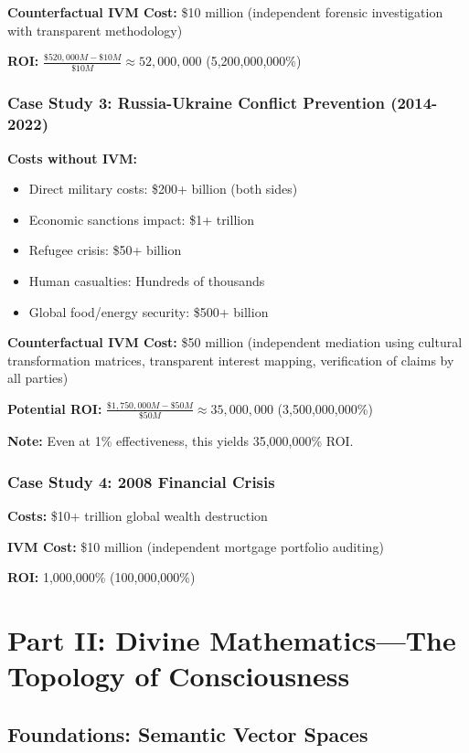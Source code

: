 \documentclass[11pt,a4paper]{article}
\theoremstyle{definition}
\theoremstyle{remark}
\begin{document}
\begin{small}
\textbf{Counterfactual IVM Cost:} \$10 million (independent forensic investigation with transparent methodology)

\textbf{ROI:} $\frac{\$520,000M - \$10M}{\$10M} \approx 52,000,000$ (5,200,000,000\%)

\subsubsection{Case Study 3: Russia-Ukraine Conflict Prevention (2014-2022)}

\textbf{Costs without IVM:}
\begin{itemize}
\item Direct military costs: \$200+ billion (both sides)
\item Economic sanctions impact: \$1+ trillion
\item Refugee crisis: \$50+ billion
\item Human casualties: Hundreds of thousands
\item Global food/energy security: \$500+ billion
\end{itemize}

\textbf{Counterfactual IVM Cost:} \$50 million (independent mediation using cultural transformation matrices, transparent interest mapping, verification of claims by all parties)

\textbf{Potential ROI:} $\frac{\$1,750,000M - \$50M}{\$50M} \approx 35,000,000$ (3,500,000,000\%)

\textbf{Note:} Even at 1\% effectiveness, this yields 35,000,000\% ROI.

\subsubsection{Case Study 4: 2008 Financial Crisis}

\textbf{Costs:} \$10+ trillion global wealth destruction

\textbf{IVM Cost:} \$10 million (independent mortgage portfolio auditing)

\textbf{ROI:} 1,000,000\% (100,000,000\%)

\section{Part II: Divine Mathematics—The Topology of Consciousness}

\subsection{Foundations: Semantic Vector Spaces}


\end{small}
\end{document}
